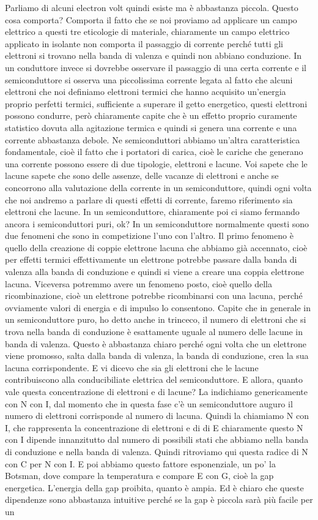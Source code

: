 {Parliamo di alcuni electron volt quindi esiste ma è abbastanza piccola. Questo cosa comporta? Comporta il fatto che se noi proviamo ad applicare un campo elettrico a questi tre eticologie di materiale, chiaramente un campo elettrico applicato in isolante non comporta il passaggio di corrente perché tutti gli elettroni si trovano nella banda di valenza e quindi non abbiano conduzione. In un conduttore invece si dovrebbe osservare il passaggio di una certa corrente e il semiconduttore si osserva una piccolissima corrente legata al fatto che alcuni elettroni che noi definiamo elettroni termici che hanno acquisito un'energia proprio perfetti termici, sufficiente a superare il getto energetico, questi elettroni possono condurre, però chiaramente capite che è un effetto proprio curamente statistico dovuta alla agitazione termica e quindi si genera una corrente e una corrente abbastanza debole. Ne semiconduttori abbiamo un'altra caratteristica fondamentale, cioè il fatto che i portatori di carica, cioè le cariche che generano una corrente possono essere di due tipologie, elettroni e lacune. Voi sapete che le lacune sapete che sono delle assenze, delle vacanze di elettroni e anche se concorrono alla valutazione della corrente in un semiconduttore, quindi ogni volta che noi andremo a parlare di questi effetti di corrente, faremo riferimento sia elettroni che lacune. In un semiconduttore, chiaramente poi ci siamo fermando ancora i semiconduttori puri, ok? In un semiconduttore normalmente questi sono due fenomeni che sono in competizione l'uno con l'altro. Il primo fenomeno è quello della creazione di coppie elettrone lacuna che abbiamo già accennato, cioè per effetti termici effettivamente un elettrone potrebbe passare dalla banda di valenza alla banda di conduzione e quindi si viene a creare una coppia elettrone lacuna. Viceversa potremmo avere un fenomeno posto, cioè quello della ricombinazione, cioè un elettrone potrebbe ricombinarsi con una lacuna, perché ovviamente valori di energia e di impulso lo consentono. Capite che in generale in un semiconduttore puro, ho detto anche in trinceco, il numero di elettroni che si trova nella banda di conduzione è esattamente uguale al numero delle lacune in banda di valenza. Questo è abbastanza chiaro perché ogni volta che un elettrone viene promosso, salta dalla banda di valenza, la banda di conduzione, crea la sua lacuna corrispondente. E vi dicevo che sia gli elettroni che le lacune contribuiscono alla conducibiliate elettrica del semiconduttore. E allora, quanto vale questa concentrazione di elettroni e di lacune? La indichiamo genericamente con N con I, dal momento che in questa fase c'è un semiconduttore auguro il numero di elettroni corrisponde al numero di lacuna. Quindi la chiamiamo N con I, che rappresenta la concentrazione di elettroni e di di E chiaramente questo N con I dipende innanzitutto dal numero di possibili stati che abbiamo nella banda di conduzione e nella banda di valenza. Quindi ritroviamo qui questa radice di N con C per N con I. E poi abbiamo questo fattore esponenziale, un po' la Botsman, dove compare la temperatura e compare E con G, cioè la gap energetica. L'energia della gap proibita, quanto è ampia. Ed è chiaro che queste dipendenze sono abbastanza intuitive perché se la gap è piccola sarà più facile per un }
